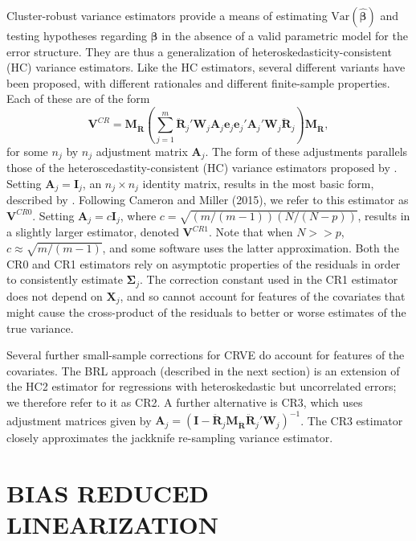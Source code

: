 \documentclass[12pt]{article}\usepackage[]{graphicx}\usepackage[]{color}
\newcommand{\Var}{\text{Var}}
\newcommand{\bm}{\mathbf}
\newcommand{\bs}{\boldsymbol}
\begin{document}
Cluster-robust variance estimators provide a means of estimating $\Var\left(\bs{\hat\beta}\right)$ and testing hypotheses regarding $\bs\beta$ in the absence of a valid parametric model for the error structure. 
They are thus a generalization of heteroskedasticity-consistent (HC) variance estimators.
Like the HC estimators, several different variants have been proposed, with different rationales and different finite-sample properties. 
Each of these are of the form
\begin{equation}
\label{eq:V_small}
\bm{V}^{CR} = \bm{M_{\ddot{R}}}\left(\sum_{j=1}^m \bm{\ddot{R}}_j'\bm{W}_j \bm{A}_j \bm{e}_j \bm{e}_j' \bm{A}_j' \bm{W}_j \bm{\ddot{R}}_j\right) \bm{M_{\ddot{R}}},
\end{equation}
for some $n_j$ by $n_j$ adjustment matrix $\bm{A}_j$. 
The form of these adjustments parallels those of the heteroscedastity-consistent (HC) variance estimators proposed by \citet*{MacKinnon1985some}. 
Setting $\bm{A}_j = \bm{I}_j$, an $n_j \times n_j$ identity matrix, results in the most basic form, described by \citet{Liang1986longitudinal}. 
Following Cameron and Miller (2015), we refer to this estimator as $\bm{V}^{CR0}$. 
Setting $\bm{A}_j = c\bm{I}_j$, where $c = \sqrt{(m/(m-1))(N/(N - p))}$, results in a slightly larger estimator, denoted $\bm{V}^{CR1}$.
Note that when $N >> p$, $c \approx \sqrt{m/(m-1)}$, and some software uses the latter approximation.
Both the CR0 and CR1 estimators rely on asymptotic properties of the residuals in order to consistently estimate $\bs\Sigma_j$. 
The correction constant used in the CR1 estimator does not depend on $\bm{X}_j$, and so cannot account for features of the covariates that might cause the cross-product of the residuals to better or worse estimates of the true variance. 

Several further small-sample corrections for CRVE do account for features of the covariates.
The BRL approach (described in the next section) is an extension of the HC2 estimator for regressions with heteroskedastic but uncorrelated errors; we therefore refer to it as CR2. 
A further alternative is CR3, which uses adjustment matrices given by $\bm{A}_j = \left(\bm{I} - \bm{\ddot{R}}_j \bm{M_{\ddot{R}}}\bm{\ddot{R}}_j'\bm{W}_j\right)^{-1}$. The CR3 estimator closely approximates the jackknife re-sampling variance estimator. 

\section{BIAS REDUCED LINEARIZATION}
\label{sec:BRL}
\end{document}

